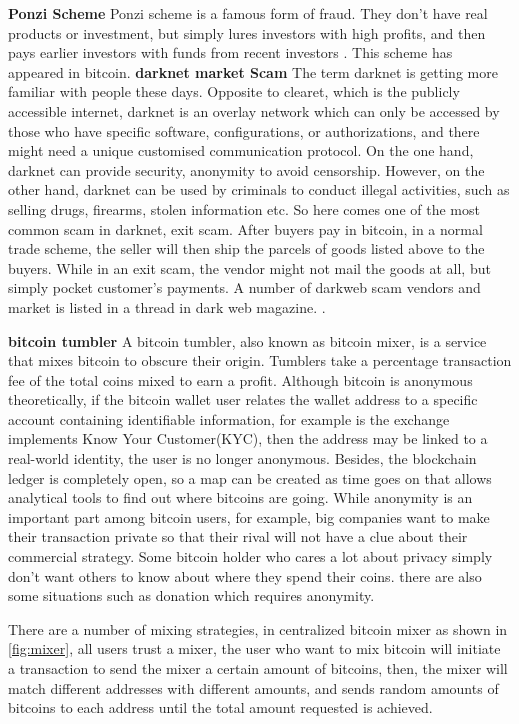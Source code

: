 \textbf{Ponzi Scheme}
Ponzi scheme is a famous form of fraud. They don't have real products or investment, but simply lures investors with high profits, and then pays earlier investors with funds from recent investors \cite{vasek2018analyzing}. This scheme has appeared in bitcoin.
\textbf{darknet market Scam}
The term darknet is getting more familiar with people these days. Opposite to clearet, which is the publicly accessible internet, darknet is an overlay network which can only be accessed by those who have specific software, configurations, or authorizations, and there might need a unique customised communication protocol. On the one hand, darknet can provide security, anonymity to avoid censorship. However, on the other hand, darknet can be used by criminals to conduct illegal activities, such as selling drugs, firearms, stolen information etc. So here comes one of the most common scam in darknet, exit scam. After buyers pay in bitcoin, in a normal trade scheme, the seller will then ship the parcels of goods listed above to the buyers. While in an exit scam, the vendor might not mail the goods at all, but simply pocket customer's payments. A number of darkweb scam vendors and market is listed in a thread in dark web magazine. \cite{darkweb-scam-list}.



\textbf{bitcoin tumbler}
\label{bitcoin-tumbler}
A bitcoin tumbler, also known as bitcoin mixer, is a service that mixes bitcoin to obscure their origin. Tumblers take a percentage transaction fee of the total coins mixed to earn a profit. Although bitcoin is anonymous theoretically, 
if the bitcoin wallet user relates the wallet address to a specific account containing identifiable information, for example is the exchange implements Know Your Customer(KYC), then the address may be linked to a real-world identity, the user is no longer anonymous. Besides, the blockchain ledger is completely open, so a map can be created as time goes on that allows analytical tools to find out where bitcoins are going. While anonymity is an important part among bitcoin users, for example, big companies want to make their transaction private so that their 
rival will not have a clue about their commercial strategy. Some bitcoin holder who cares a lot about privacy simply don't want others to know about where they spend their coins. there are also some situations such as donation which requires anonymity.

There are a number of mixing strategies, in centralized bitcoin mixer as shown in \ref{fig:mixer}, all users trust a mixer, the user who want to mix bitcoin will initiate a transaction to send the mixer a certain amount of bitcoins, then, the mixer will match different addresses with different amounts, and sends random amounts of bitcoins to each address until the total amount requested is achieved.

